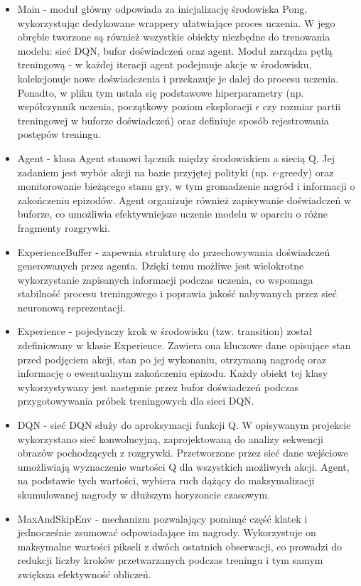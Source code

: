 \documentclass[a4paper, 12pt]{article}
\numberwithin{equation}{section}
\begin{document}
    \begin{itemize}
        \item Main - moduł główny odpowiada za inicjalizację środowiska Pong, wykorzystując dedykowane wrappery ułatwiające proces uczenia. W jego obrębie tworzone są również wszystkie obiekty niezbędne do trenowania modelu: sieć DQN, bufor doświadczeń oraz agent. Moduł zarządza pętlą treningową - w każdej iteracji agent podejmuje akcje w środowisku, kolekcjonuje nowe doświadczenia i przekazuje je dalej do procesu uczenia. Ponadto, w pliku tym ustala się podstawowe hiperparametry (np. współczynnik uczenia, początkowy poziom eksploracji \( \epsilon \) czy rozmiar partii treningowej w buforze doświadczeń) oraz definiuje sposób rejestrowania postępów treningu.
        \item Agent - klasa Agent stanowi łącznik między środowiskiem a siecią Q. Jej zadaniem jest wybór akcji na bazie przyjętej polityki (np. \( \epsilon \)-greedy) oraz monitorowanie bieżącego stanu gry, w tym gromadzenie nagród i informacji o zakończeniu epizodów. Agent organizuje również zapisywanie doświadczeń w buforze, co umożliwia efektywniejsze uczenie modelu w oparciu o różne fragmenty rozgrywki.
        \item ExperienceBuffer - zapewnia strukturę do przechowywania doświadczeń generowanych przez agenta. Dzięki temu możliwe jest wielokrotne wykorzystanie zapisanych informacji podczas uczenia, co wspomaga stabilność procesu treningowego i poprawia jakość nabywanych przez sieć neuronową reprezentacji.
        \item Experience - pojedynczy krok w środowisku (tzw. transition) został zdefiniowany w klasie Experience. Zawiera ona kluczowe dane opisujące stan przed podjęciem akcji, stan po jej wykonaniu, otrzymaną nagrodę oraz informację o ewentualnym zakończeniu epizodu. Każdy obiekt tej klasy wykorzystywany jest następnie przez bufor doświadczeń podczas przygotowywania próbek treningowych dla sieci DQN.
        \item DQN - sieć DQN służy do aproksymacji funkcji Q. W opisywanym projekcie wykorzystano sieć konwolucyjną, zaprojektowaną do analizy sekwencji obrazów pochodzących z rozgrywki. Przetworzone przez sieć dane wejściowe umożliwiają wyznaczenie wartości Q dla wszystkich możliwych akcji. Agent, na podstawie tych wartości, wybiera ruch dążący do maksymalizacji skumulowanej nagrody w dłuższym horyzoncie czasowym.
        \item MaxAndSkipEnv - mechanizm pozwalający pominąć część klatek i jednocześnie zsumować odpowiadające im nagrody. Wykorzystuje on maksymalne wartości pikseli z dwóch ostatnich obserwacji, co prowadzi do redukcji liczby kroków przetwarzanych podczas treningu i tym samym zwiększa efektywność obliczeń.

\end{itemize}
\end{document}
